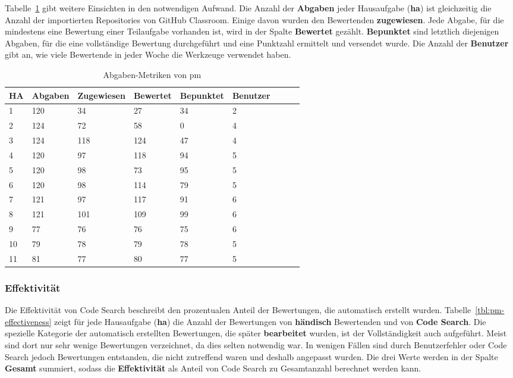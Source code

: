 \renewcommand{\thefootnote}{\arabic{footnote}}

Tabelle~\ref{tbl:pm-solutions} gibt weitere Einsichten in den notwendigen Aufwand.
Die Anzahl der \textbf{Abgaben} jeder Hausaufgabe (\textbf{\acs{ha}}) ist gleichzeitig die Anzahl der importierten Repositories von GitHub Classroom.
Einige davon wurden den Bewertenden \textbf{zugewiesen}.
Jede Abgabe, für die mindestens eine Bewertung einer Teilaufgabe vorhanden ist, wird in der Spalte \textbf{Bewertet} gezählt.
\textbf{Bepunktet} sind letztlich diejenigen Abgaben, für die eine vollständige Bewertung durchgeführt und eine Punktzahl ermittelt und versendet wurde.
Die Anzahl der \textbf{Benutzer} gibt an, wie viele Bewertende in jeder Woche die Werkzeuge verwendet haben.

\begin{table}
    \centering
    \caption{Abgaben-Metriken von \ac{pm}}
    \begin{tabular}{|l|l|l|l|l|l|l|l|l|}
    \hline
        HA & Abgaben & Zugewiesen & Bewertet & Bepunktet & Benutzer \\ \hline
        1  & 120 &  34 &  27 & 34 & 2  \\ \hline
        2  & 124 &  72 &  58 &  0 & 4  \\ \hline
        3  & 124 & 118 & 124 & 47 & 4  \\ \hline
        4  & 120 &  97 & 118 & 94 & 5  \\ \hline
        5  & 120 &  98 &  73 & 95 & 5  \\ \hline
        6  & 120 &  98 & 114 & 79 & 5  \\ \hline
        7  & 121 &  97 & 117 & 91 & 6  \\ \hline
        8  & 121 & 101 & 109 & 99 & 6  \\ \hline
        9  &  77 &  76 &  76 & 75 & 6  \\ \hline
        10 &  79 &  78 &  79 & 78 & 5  \\ \hline
        11 &  81 &  77 &  80 & 77 & 5  \\ \hline
    \end{tabular}
    \label{tbl:pm-solutions}
\end{table}

\subsubsection{Effektivität}

Die Effektivität von Code Search beschreibt den prozentualen Anteil der Bewertungen, die automatisch erstellt wurden.
Tabelle~\ref{tbl:pm-effectiveness} zeigt für jede Hausaufgabe (\textbf{\acs{ha}}) die Anzahl der Bewertungen von \textbf{händisch} Bewertenden und von \textbf{Code Search}.
Die spezielle Kategorie der automatisch erstellten Bewertungen, die später \textbf{bearbeitet} wurden, ist der Vollständigkeit auch aufgeführt.
Meist sind dort nur sehr wenige Bewertungen verzeichnet, da dies selten notwendig war.
In wenigen Fällen sind durch Benutzerfehler oder Code Search jedoch Bewertungen entstanden, die nicht zutreffend waren und deshalb angepasst wurden.
Die drei Werte werden in der Spalte \textbf{Gesamt} summiert, sodass die \textbf{Effektivität} als Anteil von Code Search zu Gesamtanzahl berechnet werden kann.

